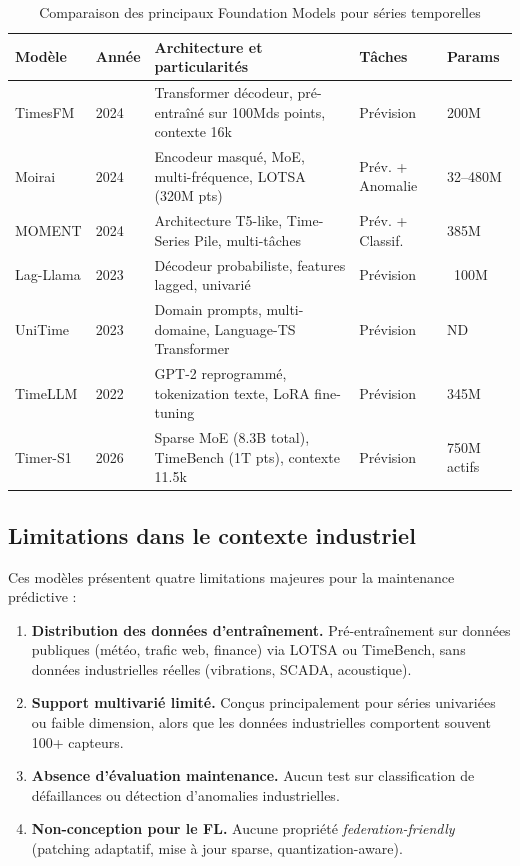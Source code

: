 \documentclass[12pt, a4paper]{report}
\begin{document}
\begin{table}[h!]
\centering
\caption{Comparaison des principaux Foundation Models pour séries temporelles}
\label{tab:tsfm-detailed}
\renewcommand{\arraystretch}{1.5}
\begin{tabularx}{\textwidth}{llXp{2.5cm}l}
\toprule
\textbf{Modèle} & \textbf{Année} & \textbf{Architecture et particularités} & \textbf{Tâches} & \textbf{Params} \\
\midrule
TimesFM & 2024 & Transformer décodeur, pré-entraîné sur 100Mds points, contexte 16k & Prévision & 200M \\
Moirai & 2024 & Encodeur masqué, MoE, multi-fréquence, LOTSA (320M pts) & Prév. + Anomalie & 32--480M \\
MOMENT & 2024 & Architecture T5-like, Time-Series Pile, multi-tâches & Prév. + Classif. & 385M \\
Lag-Llama & 2023 & Décodeur probabiliste, features lagged, univarié & Prévision & ~100M \\
UniTime & 2023 & Domain prompts, multi-domaine, Language-TS Transformer & Prévision & ND \\
TimeLLM & 2022 & GPT-2 reprogrammé, tokenization texte, LoRA fine-tuning & Prévision & 345M \\
Timer-S1 & 2026 & Sparse MoE (8.3B total), TimeBench (1T pts), contexte 11.5k & Prévision & 750M actifs \\
\bottomrule
\end{tabularx}
\end{table}

\subsection{Limitations dans le contexte industriel}

Ces modèles présentent quatre limitations majeures pour la maintenance prédictive :

\begin{enumerate}
  \item \textbf{Distribution des données d'entraînement.} Pré-entraînement sur données
  publiques (météo, trafic web, finance) via LOTSA ou TimeBench, sans données industrielles
  réelles (vibrations, SCADA, acoustique).

  \item \textbf{Support multivarié limité.} Conçus principalement pour séries univariées
  ou faible dimension, alors que les données industrielles comportent souvent 100+ capteurs.

  \item \textbf{Absence d'évaluation maintenance.} Aucun test sur classification de
  défaillances ou détection d'anomalies industrielles.

  \item \textbf{Non-conception pour le FL.} Aucune propriété \textit{federation-friendly}
  (patching adaptatif, mise à jour sparse, quantization-aware).
\end{enumerate}
\end{document}
